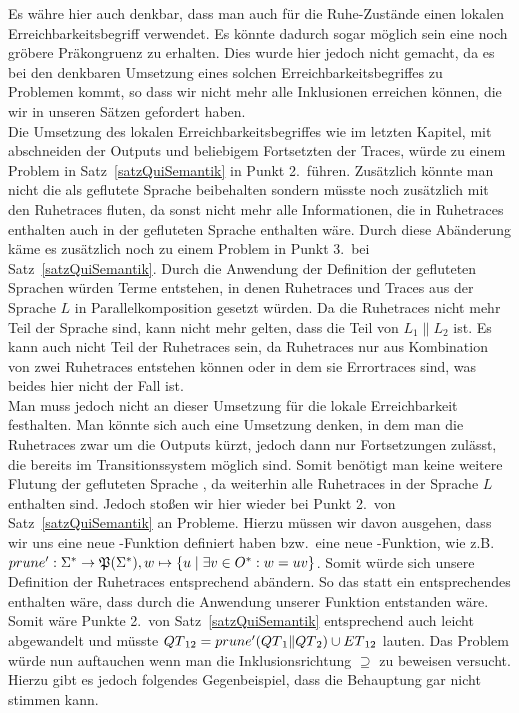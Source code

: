 Es währe hier auch denkbar, dass man auch für die Ruhe-Zustände einen lokalen
Erreichbarkeitsbegriff verwendet. Es könnte dadurch sogar möglich sein eine
noch gröbere Präkongruenz zu erhalten. Dies wurde hier jedoch nicht gemacht, da
es bei den denkbaren Umsetzung eines solchen Erreichbarkeitsbegriffes zu
Problemen kommt, so dass wir nicht mehr alle Inklusionen erreichen können, die
wir in unseren Sätzen gefordert haben.\\
Die Umsetzung des lokalen Erreichbarkeitsbegriffes wie im letzten Kapitel, mit
abschneiden der Outputs und beliebigem Fortsetzten der Traces, würde zu einem
Problem in Satz~\ref{satzQuiSemantik} in Punkt 2.\ führen. Zusätzlich könnte
man nicht die \EL{} als geflutete Sprache beibehalten sondern müsste noch
zusätzlich mit den Ruhetraces fluten, da sonst nicht mehr alle
Informationen, die in Ruhetraces enthalten auch in der gefluteten Sprache
enthalten wäre. Durch diese Abänderung käme es zusätzlich noch zu einem Problem
in Punkt 3.\ bei Satz~\ref{satzQuiSemantik}. Durch die Anwendung der Definition
der gefluteten Sprachen würden Terme entstehen, in denen Ruhetraces und Traces
aus der Sprache $L$ in Parallelkomposition gesetzt würden. Da die Ruhetraces
nicht mehr Teil der Sprache sind, kann nicht mehr gelten, dass die Teil von
$L_1\|L_2$ ist. Es kann auch nicht Teil der Ruhetraces sein, da Ruhetraces nur
aus Kombination von zwei Ruhetraces entstehen können oder in dem sie
Errortraces sind, was beides hier nicht der Fall ist.\\ %
Man muss jedoch nicht an dieser Umsetzung für die lokale Erreichbarkeit
festhalten. Man könnte sich auch eine Umsetzung denken, in dem man die
Ruhetraces zwar um die Outputs kürzt, jedoch dann nur Fortsetzungen zulässt,
die bereits im Transitionssystem möglich sind. Somit benötigt man keine weitere
Flutung der gefluteten Sprache \EL{}, da weiterhin alle Ruhetraces in der
Sprache $L$ enthalten sind. Jedoch stoßen wir hier wieder bei Punkt 2.\ von
Satz~\ref{satzQuiSemantik} an Probleme. Hierzu müssen wir davon ausgehen, dass
wir uns eine neue \prune{}-Funktion definiert haben bzw.\ eine neue
\cont{}-Funktion, wie z.B. $prune'{}: \Sigma ^*\rightarrow
\mathfrak{P}(\Sigma ^*), w\mapsto \{u\mid \exists v\in O^*:w=uv\}$. Somit würde
sich unsere Definition der Ruhetraces entsprechend abändern. So das statt
\StQT{} ein entsprechendes \PrQT{} enthalten wäre, dass durch die Anwendung
unserer \prunenew{} Funktion entstanden wäre. Somit wäre Punkte 2.\ von
Satz~\ref{satzQuiSemantik} entsprechend auch leicht abgewandelt und müsste
$QT{}_{12}=prune' (QT{}_1\|QT{}_2)\cup ET{}_{12}$ lauten. Das Problem
würde nun auftauchen wenn man die Inklusionsrichtung $\supseteq$ zu beweisen
versucht. Hierzu gibt es jedoch folgendes Gegenbeispiel, dass die Behauptung
gar nicht stimmen kann. %
